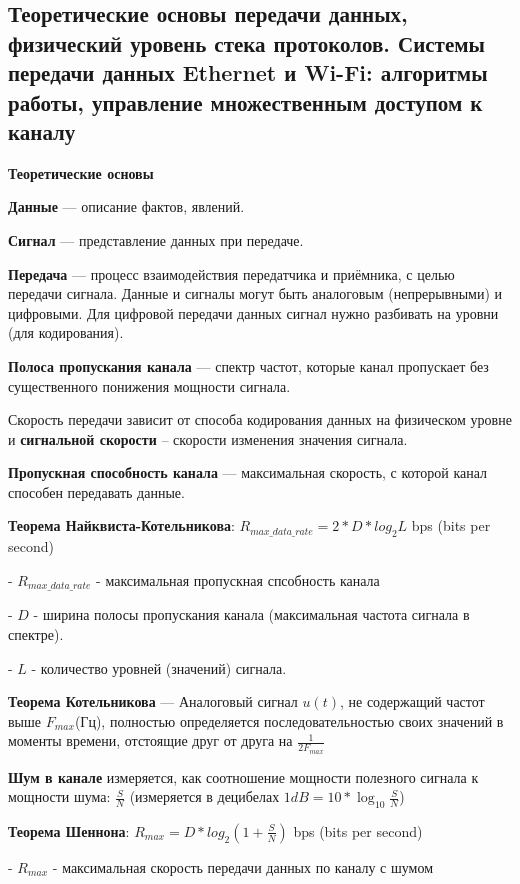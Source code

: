 \subsection{Теоретические основы передачи данных, физический уровень стека протоколов. Системы передачи данных Ethernet и Wi-Fi: алгоритмы работы, управление множественным доступом к каналу}

\textbf{Теоретические основы}


\textbf{Данные} --- описание фактов, явлений.

\textbf{Сигнал} --- представление данных при передаче.

\textbf{Передача} --- процесс взаимодействия передатчика и приёмника, с целью передачи сигнала.
Данные и сигналы могут быть аналоговым (непрерывными) и цифровыми.
Для цифровой передачи данных сигнал нужно разбивать на уровни (для кодирования).

\textbf{Полоса пропускания канала} --- спектр частот, которые канал пропускает без существенного понижения мощности сигнала.

Скорость передачи зависит от способа кодирования данных на физическом уровне и \textbf{сигнальной скорости} -- скорости изменения значения сигнала.

\textbf{Пропускная способность канала} --- максимальная скорость, с которой канал способен передавать данные.

\bigbreak
\textbf{Теорема Найквиста-Котельникова}: $R_{max\_data\_rate} = 2*D*log_2{L}$ bps (bits per second)

- $R_{max\_data\_rate}$ - максимальная пропускная спсобность канала

- $D$ - ширина полосы пропускания канала (максимальная частота сигнала в спектре).

- $L$ - количество уровней (значений) сигнала.

\bigbreak
\textbf{Теорема Котельникова} --- Аналоговый сигнал $u(t)$, не содержащий частот выше $F_{max}$(Гц), полностью определяется последовательностью своих значений в моменты времени, отстоящие друг от друга на $\frac{1}{2F_{max}}$

\bigbreak
\textbf{Шум в канале} измеряется, как соотношение мощности полезного сигнала к мощности шума: $\frac{S}{N}$ (измеряется в децибелах $1dB = 10*\log_{10}{\frac{S}{N}}$)

\bigbreak
\textbf{Теорема Шеннона}: $R_{max} = D*log_2{(1+\frac{S}{N})}$ bps (bits per second)

- $R_{max}$ - максимальная скорость передачи данных по каналу с шумом

